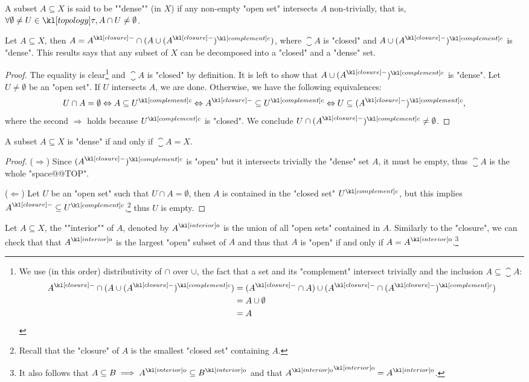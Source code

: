 \documentclass[main.tex]{subfiles}
\begin{document}
\begin{defn}[Dense]
	\AP A subset $A\subseteq X$ is said to be ""dense"" (in $X$) if any non-empty "open set" intersects $A$ non-trivially, that is, $\forall\emptyset\neq  U  \in \topo, A \cap U \neq \emptyset$.
\end{defn}
\begin{prop}[Decomposition]\label{prop:decomptop}
	Let $A\subseteq X$, then $A = \closure{A} \cap (A \cup (\closure{A})^\comple)$, where $\closure{A}$ is "closed" and $A \cup (\closure{A})^\comple$ is "dense". This results says that any subset of $X$ can be decomposed into a "closed" and a "dense" set.
\end{prop}
\begin{proof}
	The equality is clear\footnote{We use (in this order) distributivity of $\cap$ over $\cup$, the fact that a set and its "complement" intersect trivially and the inclusion $A \subseteq \closure{A}$:
    \begin{align*}
        \closure{A} \cap (A \cup (\closure{A})^\comple) &= (\closure{A} \cap A)\cup (\closure{A} \cap (\closure{A})^\comple)\\&= A \cup \emptyset\\ &= A
    \end{align*}} and $\closure{A}$ is "closed" by definition. It is left to show that $A \cup (\closure{A})^\comple$ is "dense". Let $U \neq \emptyset$ be an "open set". If $U$ intersects $A$, we are done. Otherwise, we have the following equivalences:\[U \cap A = \emptyset\Leftrightarrow A \subseteq U^\comple \Leftrightarrow \closure{A} \subseteq U^\comple \Leftrightarrow U \subseteq (\closure{A})^\comple,\]
	where the second $\Rightarrow$ holds because $U^\comple$ is "closed". We conclude $U \cap (\closure{A})^\comple \neq \emptyset$.
\end{proof}
\begin{prop}
	A subset $A \subseteq X$ is "dense" if and only if $\closure{A} = X$.
\end{prop}
\begin{proof}
	($\Rightarrow$) Since $(\closure{A})^\comple$ is "open" but it intersects trivially the "dense" set $A$, it must be empty, thus $\closure{A}$ is the whole "space@@TOP".
	
	($\Leftarrow$) Let $U$ be an "open set" such that $U \cap A = \emptyset$, then $A$ is contained in the "closed set" $U^\comple$, but this implies $\closure{A} \subseteq U^\comple$,\footnote{Recall that the "closure" of $A$ is the smallest "closed set" containing $A$.} thus $U$ is empty.
\end{proof}
\begin{defn}[Interior]
	\AP Let $A \subseteq X$, the ""interior"" of $A$, denoted by $\interior{A}$ is the union of all "open sets" contained in $A$. Similarly to the "closure", we can check that that $\interior{A}$ is the largest "open" subset of $A$ and thus that $A$ is "open" if and only if $A = \interior{A}$.\footnote{It also follows that $A \subseteq B \implies \interior{A} \subseteq \interior{B}$ and that $\interior{\interior{A}} = \interior{A}$.} 
\end{defn}
\end{document}
